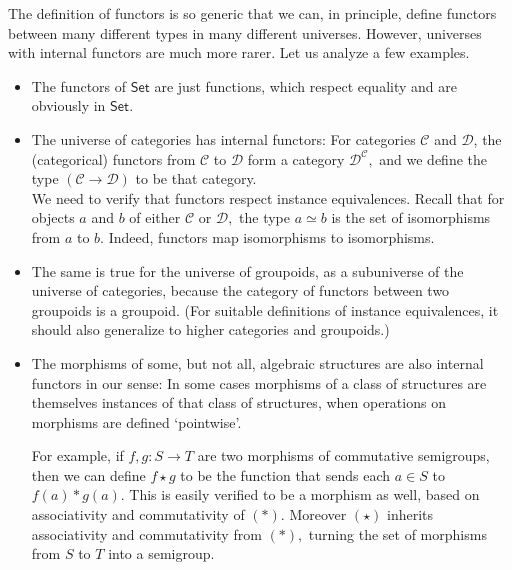 \documentclass[a4paper]{article}
\theoremstyle{definition}
\theoremstyle{remark}
\renewcommand{\equiv}{\simeq}
\newcommand{\C}{\mathcal{C}}
\newcommand{\D}{\mathcal{D}}
\newcommand{\nm}{\mathsf}
\newcommand{\universe}{\nm}
\newcommand{\Set}{\universe{Set}}
\begin{document}
The definition of functors is so generic that we can, in principle, define functors between
many different types in many different universes. However, universes with internal functors
are much more rarer. Let us analyze a few examples.
\begin{itemize}
  \item The functors of $\Set$ are just functions, which respect equality and are obviously
  in $\Set$.
  \item The universe of categories has internal functors: For categories $\C$ and $\D$, the
  (categorical) functors from $\C$ to $\D$ form a category $\D^\C,$ and we define the type
  $(\C \to \D)$ to be that category.\\
  We need to verify that functors respect instance equivalences. Recall that for objects
  $a$ and $b$ of either $\C$ or $\D,$ the type $a \equiv b$ is the set of isomorphisms from
  $a$ to $b.$ Indeed, functors map isomorphisms to isomorphisms.
  \item The same is true for the universe of groupoids, as a subuniverse of the universe of
  categories, because the category of functors between two groupoids is a groupoid. (For
  suitable definitions of instance equivalences, it should also generalize to higher
  categories and groupoids.)
  \item The morphisms of some, but not all, algebraic structures are also internal functors
  in our sense: In some cases morphisms of a class of structures are themselves instances
  of that class of structures, when operations on morphisms are defined `pointwise'.

  For example, if $f,g : S \to T$ are two morphisms of commutative semigroups, then we can
  define $f \star g$ to be the function that sends each $a \in S$ to $f(a) \ast g(a).$ This
  is easily verified to be a morphism as well, based on associativity and commutativity
  of $(\ast).$ Moreover $(\star)$ inherits associativity and commutativity from $(\ast),$
  turning the set of morphisms from $S$ to $T$ into a semigroup.


\end{itemize}
\end{document}
